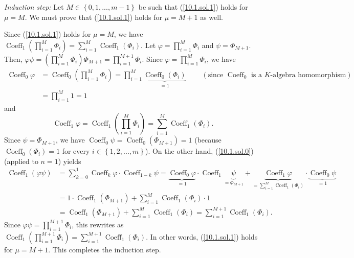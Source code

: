 \documentclass[numbers=enddot,12pt,final,onecolumn,notitlepage]{scrartcl}%
\begin{document}
\textit{Induction step:} Let $M\in\left\{  0,1,...,m-1\right\}  $ be such that
(\ref{10.1.sol.1}) holds for $\mu=M$. We must prove that (\ref{10.1.sol.1})
holds for $\mu=M+1$ as well.

Since (\ref{10.1.sol.1}) holds for $\mu=M$, we have $\operatorname*{Coeff}%
\nolimits_{1}\left(  \prod\limits_{i=1}^{M}\Phi_{i}\right)  =\sum
\limits_{i=1}^{M}\operatorname*{Coeff}\nolimits_{1}\left(  \Phi_{i}\right)  $.
Let $\varphi=\prod\limits_{i=1}^{M}\Phi_{i}$ and $\psi=\Phi_{M+1}$. Then,
$\varphi\psi=\left(  \prod\limits_{i=1}^{M}\Phi_{i}\right)  \Phi_{M+1}%
=\prod\limits_{i=1}^{M+1}\Phi_{i}$. Since $\varphi=\prod\limits_{i=1}^{M}%
\Phi_{i}$, we have
\begin{align*}
\operatorname*{Coeff}\nolimits_{0}\varphi &  =\operatorname*{Coeff}%
\nolimits_{0}\left(  \prod\limits_{i=1}^{M}\Phi_{i}\right)  =\prod
\limits_{i=1}^{M}\underbrace{\operatorname*{Coeff}\nolimits_{0}\left(
\Phi_{i}\right)  }_{=1}\ \ \ \ \ \ \ \ \ \ \left(  \text{since }%
\operatorname*{Coeff}\nolimits_{0}\text{ is a }K\text{-algebra homomorphism}%
\right) \\
&  =\prod\limits_{i=1}^{M}1=1
\end{align*}
and%
\[
\operatorname*{Coeff}\nolimits_{1}\varphi=\operatorname*{Coeff}\nolimits_{1}%
\left(  \prod\limits_{i=1}^{M}\Phi_{i}\right)  =\sum\limits_{i=1}%
^{M}\operatorname*{Coeff}\nolimits_{1}\left(  \Phi_{i}\right)  .
\]
Since $\psi=\Phi_{M+1}$, we have $\operatorname*{Coeff}\nolimits_{0}%
\psi=\operatorname*{Coeff}\nolimits_{0}\left(  \Phi_{M+1}\right)  =1$ (because
$\operatorname*{Coeff}\nolimits_{0}\left(  \Phi_{i}\right)  =1$ for every
$i\in\left\{  1,2,...,m\right\}  $). On the other hand, (\ref{10.1.sol.0})
(applied to $n=1$) yields%
\begin{align*}
\operatorname*{Coeff}\nolimits_{1}\left(  \varphi\psi\right)   &  =\sum
_{k=0}^{1}\operatorname*{Coeff}\nolimits_{k}\varphi\cdot\operatorname*{Coeff}%
\nolimits_{1-k}\psi=\underbrace{\operatorname*{Coeff}\nolimits_{0}\varphi
}_{=1}\cdot\operatorname*{Coeff}\nolimits_{1}\underbrace{\psi}_{=\Phi_{M+1}%
}+\underbrace{\operatorname*{Coeff}\nolimits_{1}\varphi}_{=\sum\limits_{i=1}%
^{M}\operatorname*{Coeff}\nolimits_{1}\left(  \Phi_{i}\right)  }%
\cdot\underbrace{\operatorname*{Coeff}\nolimits_{0}\psi}_{=1}\\
&  =1\cdot\operatorname*{Coeff}\nolimits_{1}\left(  \Phi_{M+1}\right)
+\sum\limits_{i=1}^{M}\operatorname*{Coeff}\nolimits_{1}\left(  \Phi
_{i}\right)  \cdot1\\
&  =\operatorname*{Coeff}\nolimits_{1}\left(  \Phi_{M+1}\right)
+\sum\limits_{i=1}^{M}\operatorname*{Coeff}\nolimits_{1}\left(  \Phi
_{i}\right)  =\sum\limits_{i=1}^{M+1}\operatorname*{Coeff}\nolimits_{1}\left(
\Phi_{i}\right)  .
\end{align*}
Since $\varphi\psi=\prod\limits_{i=1}^{M+1}\Phi_{i}$, this rewrites as
$\operatorname*{Coeff}\nolimits_{1}\left(  \prod\limits_{i=1}^{M+1}\Phi
_{i}\right)  =\sum\limits_{i=1}^{M+1}\operatorname*{Coeff}\nolimits_{1}\left(
\Phi_{i}\right)  $. In other words, (\ref{10.1.sol.1}) holds for $\mu=M+1$.
This completes the induction step.
\end{document}
